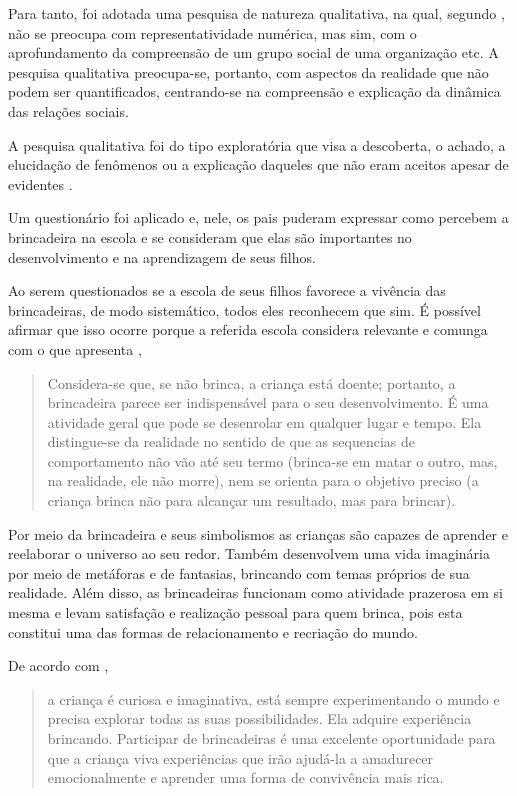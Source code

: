 \begin{refsection}
    Para tanto, foi adotada uma pesquisa de natureza qualitativa, na qual, segundo \textcite{GERHARDTAndSILVEIRA2009Métodos}, não se preocupa com representatividade numérica, mas sim, com o aprofundamento da compreensão de um grupo social de uma organização etc. A pesquisa qualitativa preocupa-se, portanto, com aspectos da realidade que não podem ser quantificados, centrando-se na compreensão e explicação da dinâmica das relações sociais. 

    A pesquisa qualitativa foi do tipo exploratória que visa a descoberta, o achado, a elucidação de fenômenos ou a explicação daqueles que não eram aceitos apesar de evidentes \cite{GONÇALVES2014Uma}. 

    Um questionário foi aplicado e, nele, os pais puderam expressar como percebem a brincadeira na escola e se consideram que elas são importantes no desenvolvimento e na aprendizagem de seus filhos. 

    Ao serem questionados se a escola de seus filhos favorece a vivência das brincadeiras, de modo sistemático, todos eles reconhecem que sim. É possível afirmar que isso ocorre porque a referida escola considera relevante e comunga com o que apresenta \textcite[p.~142]{TOURRETTE2009Introdução}, 

    \begin{quotation}
        Considera-se que, se não brinca, a criança está doente; portanto, a brincadeira parece ser indispensável para o seu desenvolvimento. É uma atividade geral que pode se desenrolar em qualquer lugar e tempo. Ela distingue-se da realidade no sentido de que as sequencias de comportamento não vão até seu termo (brinca-se em matar o outro, mas, na realidade, ele não morre), nem se orienta para o objetivo preciso (a criança brinca não para alcançar um resultado, mas para brincar). 
    \end{quotation}

    Por meio da brincadeira e seus simbolismos as crianças são capazes de aprender e reelaborar o universo ao seu redor. Também desenvolvem uma vida imaginária por meio de metáforas e de fantasias, brincando com temas próprios de sua realidade. Além disso, as brincadeiras funcionam como atividade prazerosa em si mesma e levam satisfação e realização pessoal para quem brinca, pois esta constitui uma das formas de relacionamento e recriação do mundo.  

    De acordo com \textcite[p.~21]{MALUF2003Brincar},  

    \begin{quotation}
        a criança é curiosa e imaginativa, está sempre experimentando o mundo e precisa explorar todas as suas possibilidades. Ela adquire experiência brincando. Participar de brincadeiras é uma excelente oportunidade para que a criança viva experiências que irão ajudá-la a amadurecer emocionalmente e aprender uma forma de convivência mais rica. 
    \end{quotation}


\end{refsection}
